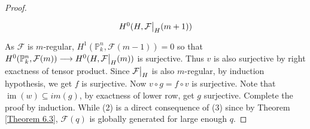 \documentclass{ctexart}
\newcommand{\im}{\operatorname{im}}
\begin{document}
\begin{proof}
\begin{equation*}
\begin{tikzcd}[sep = small]
            H^{0}(H, \mathcal{F}\big{|}_{H}(m + 1))
        \end{tikzcd}
    \end{equation*}
    As $\mathcal{F}$ is $m$-regular, $H^{1}(\mathbb{P}_{k}^{n}, \mathcal{F}(m - 1)) = 0$ so that $H^{0}(\mathbb{P}_{k}^{n}, \mathcal{F}(m)) \longrightarrow H^{0}(H, \mathcal{F}\big{|}_{H}(m))$ is surjective.
    Thus $v$ is also surjective by right exactness of tensor product.
    Since $\mathcal{F}\big{|}_{H}$ is also $m$-regular, by induction hypothesis, we get $f$ is surjective.
    Now $v \circ g = f \circ v$ is surjective.
    Note that $\im(w) \subseteq im(g)$, by exactness of lower row, get $g$ surjective.
    Complete the proof by induction. 
    While (2) is a direct consequence of (3) since by Theorem \ref{Theorem 6.3}, $\mathcal{F}(q)$ is globally generated for large enough $q$.
\end{proof}
\end{document}
